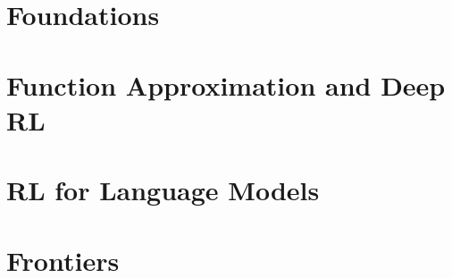 \documentclass[oneside,openany]{book}
\theoremstyle{definition}
\theoremstyle{plain}
\theoremstyle{remark}
\begin{document}
\mainmatter

\part{Foundations}

\part{Function Approximation and Deep RL}

\part{RL for Language Models}

\part{Frontiers}

\appendix


\backmatter




% 

\printindex
\end{document}

